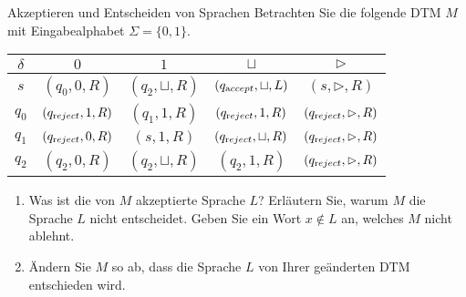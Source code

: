 \documentclass[answers]{submit}
\begin{document}
\exerciseheader
\exercisetitle

\begin{exercise}[6]{Akzeptieren und Entscheiden von Sprachen}
  Betrachten Sie die folgende DTM $M$ mit Eingabealphabet $\Sigma=\{0,1\}$.

  \begin{center}
    \begin{tabular}{c|c|c|c|c}
      $\delta$ & $0$         & $1$              & $\sqcup$         & $\rhd$         \\\hline
      $s$      & $(q_0,0,R)$ & $(q_2,\sqcup,R)$ & $(q_{{\textup accept}},\sqcup,L)$ & $(s,\rhd,R)$   \\\hline
      $q_0$    & $(q_{{\textup reject}},1,R)$ & $(q_1,1,R)$      & $(q_{{\textup reject}},1,R)$      & $(q_{{\textup reject}},\rhd,R)$ \\\hline
      $q_1$    & $(q_{{\textup reject}},0,R)$ & $(s,1,R)$        & $(q_{{\textup reject}},\sqcup,R)$ & $(q_{{\textup reject}},\rhd,R)$ \\\hline
      $q_2$    & $(q_2,0,R)$ & $(q_2,\sqcup,R)$ & $(q_2,1,R)$      & $(q_{{\textup reject}},\rhd,R)$
    \end{tabular}
  \end{center}

  \begin{enumerate}
    \item Was ist die von $M$ akzeptierte Sprache $L$?
          Erläutern Sie, warum $M$ die Sprache $L$ nicht entscheidet.
          Geben Sie ein Wort $x\not\in L$ an, welches $M$ nicht ablehnt.
    \item Ändern Sie $M$ so ab, dass die Sprache $L$ von Ihrer geänderten DTM entschieden wird.
  \end{enumerate}
\end{exercise}
\end{document}
